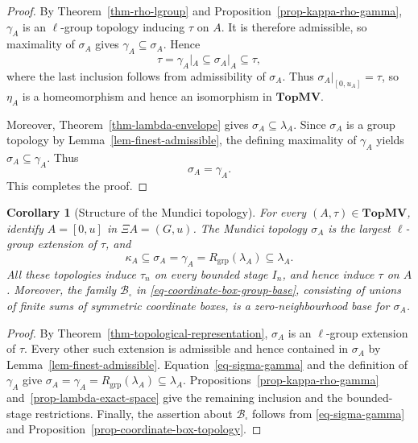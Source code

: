 \documentclass[preprint,3p]{elsarticle}
\theoremstyle{plain}
\newtheorem{cor}[thm]{Corollary}
\theoremstyle{definition}
\newcommand{\TopMV}{\mathbf{TopMV}}
\numberwithin{equation}{section}
\begin{document}
\begin{proof}
By Theorem~\ref{thm-rho-lgroup} and
Proposition~\ref{prop-kappa-rho-gamma}, $\gamma_A$ is an
$\ell$-group topology inducing $\tau$ on $A$.
It is therefore admissible, so maximality of $\sigma_A$ gives
$\gamma_A\subseteq\sigma_A$.  Hence
\[
 \tau=\gamma_A|_A\subseteq\sigma_A|_A\subseteq\tau,
\]
where the last inclusion follows from admissibility of $\sigma_A$.
Thus $\sigma_A|_{[0,u_A]}=\tau$, so $\eta_A$ is a
homeomorphism and hence an isomorphism in $\TopMV$.

Moreover, Theorem~\ref{thm-lambda-envelope} gives
$\sigma_A\subseteq\lambda_A$.
Since $\sigma_A$ is a group topology by Lemma~\ref{lem-finest-admissible},
the defining maximality of $\gamma_A$ yields
$\sigma_A\subseteq\gamma_A$.
Thus
\begin{equation}
\label{eq-sigma-gamma}
 \sigma_A=\gamma_A.
\end{equation}
This completes the proof.
\end{proof}

\begin{cor}[Structure of the Mundici topology]
\label{cor-reconstruction-topology-chain}
For every $(A,\tau)\in\TopMV$, identify $A=[0,u]$ in $\Xi A=(G,u)$.
The Mundici topology $\sigma_A$ is the largest $\ell$-group extension
of $\tau$, and
\begin{equation}
\label{eq-topological-reconstruction-chain}
 \kappa_A\subseteq\sigma_A=\gamma_A
 =R_{\mathrm{grp}}(\lambda_A)\subseteq\lambda_A.
\end{equation}
All these topologies induce $\tau_n$ on every bounded stage $I_n$,
and hence induce $\tau$ on $A$.
Moreover, the family $\mathcal B_\square$ in
\eqref{eq-coordinate-box-group-base}, consisting of unions of finite
sums of symmetric coordinate boxes, is a zero-neighbourhood base
for $\sigma_A$.
\end{cor}

\begin{proof}
By Theorem~\ref{thm-topological-representation}, $\sigma_A$ is an
$\ell$-group extension of $\tau$.  Every other such extension is
admissible and hence contained in $\sigma_A$ by
Lemma~\ref{lem-finest-admissible}.
Equation~\eqref{eq-sigma-gamma} and the definition of $\gamma_A$ give
$\sigma_A=\gamma_A=R_{\mathrm{grp}}(\lambda_A)\subseteq\lambda_A$.
Propositions~\ref{prop-kappa-rho-gamma} and~\ref{prop-lambda-exact-space}
give the remaining inclusion and the bounded-stage restrictions.
Finally, the assertion about $\mathcal B_\square$ follows from
\eqref{eq-sigma-gamma} and
Proposition~\ref{prop-coordinate-box-topology}.
\end{proof}
\end{document}
